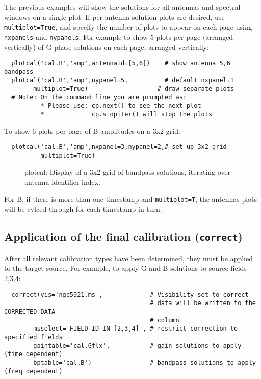 The previous examples will show the solutions for all antennas and
spectral windows on a single plot.  If per-antenna solution plots are
desired, use {\tt multiplot=True}, and specify the number of plots to
appear on each page using {\tt nxpanels} and {\tt nypanels}. For
example to show 5 plots per page (arranged vertically) of G phase
solutions on each page, arranged vertically:

\small
\begin{verbatim}
  plotcal('cal.B','amp',antennaid=[5,6])    # show antenna 5,6 bandpass
  plotcal('cal.B','amp',nypanel=5,          # default nxpanel=1
        multiplot=True)                   # draw separate plots
  # Note: On the command line you are prompted as:
          * Please use: cp.next() to see the next plot
          *             cp.stopiter() will stop the plots
\end{verbatim}
\normalsize

To show 6 plots per page of B amplitudes on a 3x2 grid:

\small
\begin{verbatim}
  plotcal('cal.B','amp',nxpanel=3,nypanel=2,# set up 3x2 grid
          multiplot=True)
\end{verbatim}
\normalsize

\begin{figure}[h!]
\caption{\label{fig:plotcal_Bmulti} plotcal: Display of a 3x2 grid of
  bandpass solutions, iterating over antenna identifier index.} 
\hrulefill
\end{figure}

For B, if there is more than one timestamp and {\tt multiplot=T}, the
antennas plots will be cylced through for each timestamp in turn.


\subsection{Application of the final calibration ({\tt correct})}
\label{subsection:synth.correct}

After all relevant calibration types have been determined, they must
be applied to the target source.  For example, to apply G and B
solutions to source fields 2,3,4:

\small
\begin{verbatim}
  correct(vis='ngc5921.ms',             # Visibility set to correct
                                        # data will be written to the CORRECTED_DATA
                                        # column
        msselect='FIELD_ID IN [2,3,4]', # restrict correction to specified fields
        gaintable='cal.Gflx',           # gain solutions to apply (time dependent)
        bptable='cal.B')                # bandpass solutions to apply (freq dependent)
\end{verbatim}
\normalsize

